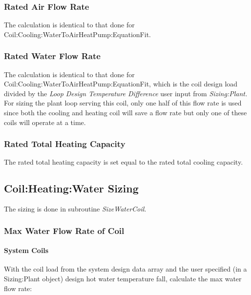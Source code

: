 \subsubsection{Rated Air Flow Rate}\label{rated-air-flow-rate-3}

The calculation is identical to that done for Coil:Cooling:WaterToAirHeatPump:EquationFit.

\subsubsection{Rated Water Flow Rate}\label{rated-water-flow-rate-3}

The calculation is identical to that done for Coil:Cooling:WaterToAirHeatPump:EquationFit, which is the coil design load divided by the \emph{Loop Design Temperature Difference} user input from \emph{Sizing:Plant.} For sizing the plant loop serving this coil, only one half of this flow rate is used since both the cooling and heating coil will save a flow rate but only one of these coils will operate at a time.

\subsubsection{Rated Total Heating Capacity}\label{rated-total-heating-capacity-1}

The rated total heating capacity is set equal to the rated total cooling capacity.

\subsection{Coil:Heating:Water Sizing}\label{coilheatingwater-sizing}

The sizing is done in subroutine \emph{SizeWaterCoil}.

\subsubsection{Max Water Flow Rate of Coil}\label{max-water-flow-rate-of-coil-1}

\paragraph{System Coils}\label{system-coils}

With the coil load from the system design data array and the user specified (in a Sizing:Plant object) design hot water temperature fall, calculate the max water flow rate:

